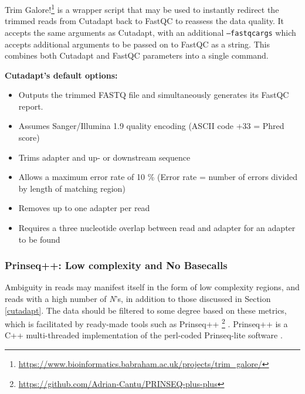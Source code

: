 Trim Galore!\footnote{\url{https://www.bioinformatics.babraham.ac.uk/projects/trim_galore/}} \citep{trimgalore} is a wrapper script that may be used to instantly redirect the trimmed reads from Cutadapt back to FastQC to reassess the data quality. It accepts the same arguments as Cutadapt, with an additional \texttt{--fastqc\textunderscore args} which accepts additional arguments to be passed on to FastQC as a string. This combines both Cutadapt and FastQC parameters into a single command. 

\textbf{Cutadapt's default options:}
\begin{itemize}\itemsep0em
\item Outputs the trimmed FASTQ file and simultaneously generates its FastQC report.
\item Assumes Sanger/Illumina 1.9 quality encoding (ASCII code +33 = Phred score)
\item Trims adapter and up- or downstream sequence
\item Allows a maximum error rate of 10 \% (Error rate = number of errors divided by length of matching region)
\item Removes up to one adapter per read
\item Requires a three nucleotide overlap between read and adapter for an adapter to be found
\end{itemize}


\subsubsection{Prinseq++: Low complexity and No Basecalls}

Ambiguity in reads may manifest itself in the form of low complexity regions, and reads with a high number of \textit{N}'s, in addition to those discussed in Section \ref{cutadapt}. The data should be filtered to some degree based on these metrics, which is facilitated by ready-made tools such as Prinseq++ \footnote{\url{https://github.com/Adrian-Cantu/PRINSEQ-plus-plus}} \citep{prinseq++}. Prinseq++ is a C++ multi-threaded implementation of the perl-coded Prinseq-lite software \citep{schmieder2011quality}. 

